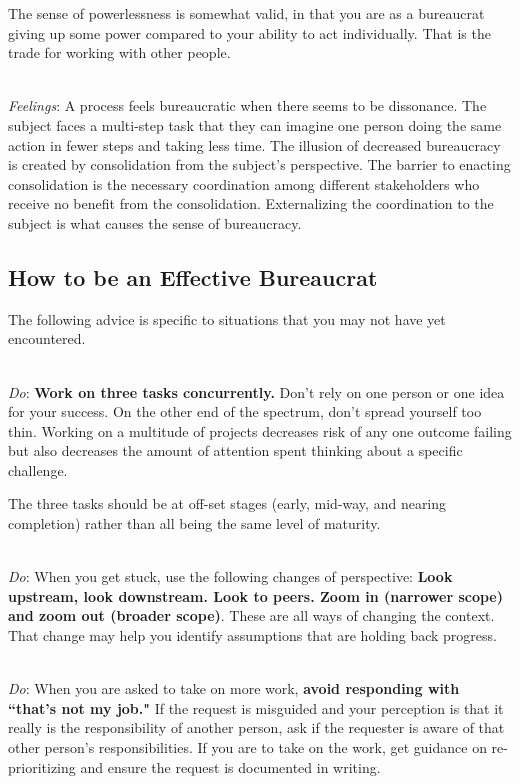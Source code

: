 The sense of powerlessness is somewhat valid, in that you are as a bureaucrat giving up some power compared to your ability to act individually. That is the trade for working with other people.

\ \\
\textit{Feelings}: A process feels bureaucratic when there seems to be dissonance. The subject faces a multi-step task that they can imagine one person doing the same action in fewer steps and taking less time. The illusion of decreased bureaucracy is created by consolidation from the subject's perspective. The barrier to enacting consolidation is the necessary coordination among different stakeholders who receive no benefit from the consolidation. Externalizing the coordination to the subject is what causes the sense of bureaucracy. 

\subsection*{How to be an Effective Bureaucrat}

The following advice is specific to situations that you may not have yet encountered. 

\ \\
\textit{Do}: \textbf{Work on three tasks concurrently.} Don't rely on one person or one idea for your success. On the other end of the spectrum, don't spread yourself too thin.
%
%
Working on a multitude of projects decreases risk of any one outcome failing but also decreases the amount of attention spent thinking about a specific challenge. 

The three tasks should be at off-set stages (early, mid-way, and nearing completion) rather than all being the same level of maturity.

\ \\
\textit{Do}: When you get stuck, use the following changes of perspective:  
\textbf{Look upstream, look downstream. Look to peers. Zoom in (narrower scope) and zoom out (broader scope)}. These are all ways of changing the context. That change may help you identify assumptions that are holding back progress.

\ \\
\textit{Do}: When you are asked to take on more work, \textbf{avoid responding with ``that's not my job."} If the request is misguided and your perception is that it really is the responsibility of another person, ask if the requester is aware of that other person's responsibilities. If you are to  take on the work, get guidance on re-prioritizing and ensure the request is documented in writing. 

